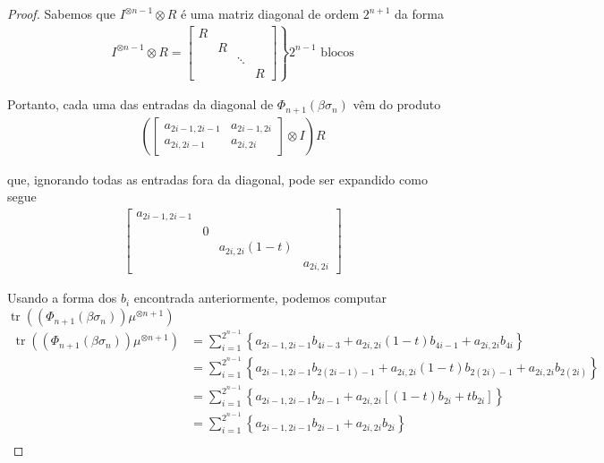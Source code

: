 \documentclass[a4paper,portuguese,11pt,twoside, leqno]{book}
\DeclareMathOperator{\tr}{tr}
\theoremstyle{definition}
\begin{document}
\begin{proof}
		\par\vspace{0.3cm} Sabemos que $I^{\otimes n-1}\otimes R$ é uma matriz diagonal de ordem $2^{n+1}$ da forma
		\begin{align*}
		I^{\otimes n-1}\otimes R = \left.\begin{bmatrix}
		R \\
		& R \\
		& & \ddots \\
		& & & R
		\end{bmatrix} \right \} 2^{n-1}\text{ blocos}
		\end{align*}
		\par\vspace{0.3cm} Portanto, cada uma das entradas da diagonal de $\Phi_{n+1}(\beta\sigma_n)$ vêm do produto
		\begin{align*}
		\left( \begin{bmatrix}
		a_{2i-1,2i-1} & a_{2i-1, 2i} \\
		a_{2i,2i-1} & a_{2i, 2i}
		\end{bmatrix}\otimes I \right)R
		\end{align*}
		\par\vspace{0.3cm} que, ignorando todas as entradas fora da diagonal, pode ser expandido como segue
		\begin{align*}
		\begin{bmatrix}
		a_{2i-1, 2i-1} \\
		& 0 \\
		& & a_{2i,2i}(1-t) \\
		& & & a_{2i,2i}
		\end{bmatrix}
		\end{align*}
		\par\vspace{0.3cm} Usando a forma dos $b_i$ encontrada anteriormente, podemos computar $\tr((\Phi_{n+1}(\beta\sigma_n))\mu^{\otimes n+1})$
		\begin{align*}
		\tr((\Phi_{n+1}(\beta\sigma_n))\mu^{\otimes n+1}) &= \sum_{i=1}^{2^{n-1}} \left\{ a_{2i-1,2i-1}b_{4i-3} + a_{2i,2i}(1-t)b_{4i-1} + a_{2i,2i}b_{4i} \right\} \\
		&= \sum_{i=1}^{2^{n-1}} \left\{ a_{2i-1,2i-1}b_{2(2i-1)-1} + a_{2i,2i}(1-t)b_{2(2i)-1} + a_{2i,2i}b_{2(2i)} \right\} \\
		&= \sum_{i=1}^{2^{n-1}} \left\{ a_{2i-1,2i-1}b_{2i-1} + a_{2i,2i}[(1-t)b_{2i} + tb_{2i}] \right\} \\
		&= \sum_{i=1}^{2^{n-1}} \left\{ a_{2i-1,2i-1}b_{2i-1} + a_{2i,2i}b_{2i} \right\} \\

\end{align*}
\end{proof}
\end{document}
